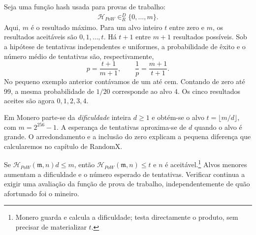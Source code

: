 
Seja uma função hash usada para provas de trabalho:
\begin{align*}
\mathcal{H}_{PoW} \in^D_R \{0,\ldots,m\} .
\end{align*}
Aqui, $m$ é o resultado máximo. Para um alvo inteiro $t$ entre zero e $m$,
os resultados aceitáveis são $0,1,\ldots,t$. Há $t+1$ entre $m+1$ resultados
possíveis. Sob a hipótese de tentativas independentes e uniformes, a
probabilidade de êxito e o número médio de tentativas são, respectivamente,
\[
 p=\frac{t+1}{m+1},\qquad \frac1p=\frac{m+1}{t+1}.
\]
No pequeno exemplo anterior contávamos de um até cem. Contando de zero até
99, a mesma probabilidade de $1/20$ corresponde ao alvo 4. Os cinco
resultados aceites são agora $0,1,2,3,4$.

%
Em Monero parte-se da \emph{dificuldade} inteira $d\geq 1$ e obtém-se o
alvo $t=\lfloor m/d\rfloor$, com $m=2^{256}-1$. A esperança de tentativas
aproxima-se de $d$ quando o alvo é grande. O arredondamento e a inclusão do
zero explicam a pequena diferença que calcularemos no capítulo de RandomX.


Se
$\mathcal H_{PoW}(\mathfrak m,n)d\leq m$, então
$\mathcal H_{PoW}(\mathfrak m,n)\leq t$ e $n$ é aceitável.\footnote{Monero
guarda e calcula a dificuldade; testa directamente o produto, sem precisar de
materializar $t$.} Alvos menores aumentam a dificuldade e o número esperado de
tentativas. Verificar continua a exigir uma avaliação da função de prova de
trabalho, independentemente de quão afortunado foi o mineiro.

